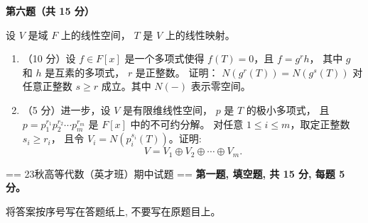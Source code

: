 \textbf{第六题（共 15 分）}

设 $V$ 是域 $F$ 上的线性空间， $T$ 是 $V$ 上的线性映射。
\begin{enumerate}
\item（10 分）设 $f \in F[x]$ 是一个多项式使得 $f(T)=0$，且 $f=g^{r} h$，
其中 $g$ 和 $h$ 是互素的多项式， $r$ 是正整数。
证明： $N(g^{r}(T))=N(g^{s}(T))$ 对任意正整数 $s \geq r$ 成立。其中 $N(-)$ 表示零空间。
\item（5 分）进一步，设 $V$ 是有限维线性空间， $p$ 是 $T$ 的极小多项式，
且 $p= p_{1}^{r_{1}} p_{2}^{r_{2}} \cdots p_{m}^{r_{m}}$ 是 $F[x]$ 中的不可约分解。
对任意 $1 \leq i \leq m$，取定正整数 $s_{i} \geq r_{i}$，
且令 $V_{i}=N(p_{i}^{s_{i}}(T))$。证明:
$$V=V_{1} \oplus V_{2} \oplus \cdots \oplus V_{m}.$$
\end{enumerate}


== 23秋高等代数（英才班）期中试题 ==
\textbf{第一题, 填空题, 共 15 分, 每题 5 分。}

将答案按序号写在答题纸上, 不要写在原题目上。

